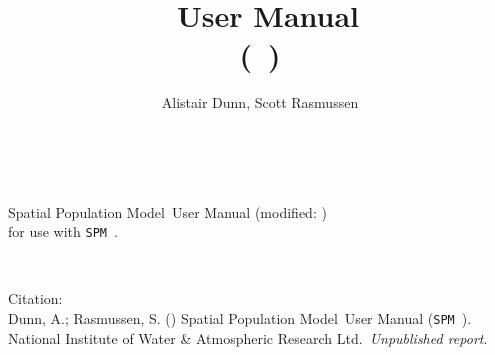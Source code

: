 \documentclass[10pt,twoside,pdftex]{article}
\title{\SPMName\ User Manual \\(\SPM\ \VER)}
\author{Alistair Dunn, Scott Rasmussen}
\date{\DocDate}
\renewcommand{\headrulewidth}{0pt}
\newcommand{\DocYear}{\SourceControlYearDoc}
\newcommand{\DocVer}{\SourceControlDateDoc}
\newcommand{\VER}{\small{}\normalsize}
\newcommand{\SPM}{\texttt{SPM}}
\newcommand{\SPMName}{Spatial Population Model}
\newcommand{\Organisation}{National Institute of Water \& Atmospheric Research Ltd.}
\newcommand{\ManualRef}{Dunn, A.; Rasmussen, S. (\DocYear) \SPMName\ User Manual (\SPM\ \VER). \Organisation\ \emph{Unpublished report}.}
\begin{document}
\maketitle
\thispagestyle{empty}
~\vfill
\begin{center}
\SPMName\ User Manual (modified: \DocVer) \\
for use with \SPM\ \VER.
\end{center}

\cleardoublepage{}
\fancyfoot[C]{\thepage}
~\vfill
\begin{center}
{Citation:\\ \ManualRef}
\end{center}

\cleardoublepage{}
\tableofcontents{}

\cleardoublepage{}
\renewcommand{\headrulewidth}{0.2pt}
\fancyhead[LE]{\slshape \nouppercase \rightmark}
\fancyhead[RO]{\slshape \nouppercase \leftmark}


\cleardoublepage{}


\cleardoublepage{}


\cleardoublepage{}


\cleardoublepage{}


\cleardoublepage{}


\cleardoublepage{}
\label{sec:syntax}
\cleardoublepage{}

\cleardoublepage{}

\cleardoublepage{}


\cleardoublepage{}


\cleardoublepage{}


\cleardoublepage{}


\cleardoublepage{}


\cleardoublepage{}


\cleardoublepage{}


\cleardoublepage{}


\cleardoublepage{}


\cleardoublepage{}
\printindex
\end{document}

